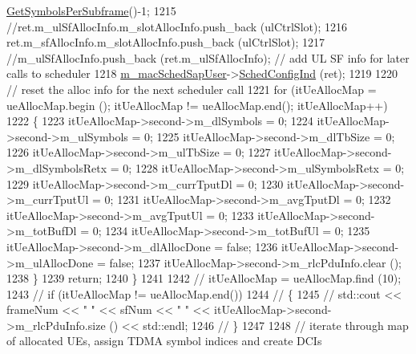 \begin{DoxyCode}
      \hyperlink{classns3_1_1MmWavePhyMacCommon_a2fe835b76e3c689defa413e395cd10cb}{GetSymbolsPerSubframe}()-1;
1215                 \textcolor{comment}{//ret.m\_ulSfAllocInfo.m\_slotAllocInfo.push\_back (ulCtrlSlot);}
1216                 ret.m\_sfAllocInfo.m\_slotAllocInfo.push\_back (ulCtrlSlot);
1217                 \textcolor{comment}{//m\_ulSfAllocInfo.push\_back (ret.m\_ulSfAllocInfo); // add UL SF info for later calls to
       scheduler}
1218                 \hyperlink{classns3_1_1MmWaveFlexTtiPfMacScheduler_a06177d3b0a466e035764a4101cfafc9e}{m\_macSchedSapUser}->\hyperlink{classns3_1_1MmWaveMacSchedSapUser_ac164dd52215c3924cf421b56089eece4}{SchedConfigInd} (ret);
1219 
1220                 \textcolor{comment}{// reset the alloc info for the next scheduler call}
1221                 \textcolor{keywordflow}{for} (itUeAllocMap = ueAllocMap.begin (); itUeAllocMap != ueAllocMap.end(); itUeAllocMap++)
1222                 \{
1223                         itUeAllocMap->second->m\_dlSymbols = 0;
1224                         itUeAllocMap->second->m\_ulSymbols = 0;
1225                         itUeAllocMap->second->m\_dlTbSize = 0;
1226                         itUeAllocMap->second->m\_ulTbSize = 0;
1227                         itUeAllocMap->second->m\_dlSymbolsRetx = 0;
1228                         itUeAllocMap->second->m\_ulSymbolsRetx = 0;
1229                         itUeAllocMap->second->m\_currTputDl = 0;
1230                         itUeAllocMap->second->m\_currTputUl = 0;
1231                         itUeAllocMap->second->m\_avgTputDl = 0;
1232                         itUeAllocMap->second->m\_avgTputUl = 0;
1233                         itUeAllocMap->second->m\_totBufDl = 0;
1234                         itUeAllocMap->second->m\_totBufUl = 0;
1235                         itUeAllocMap->second->m\_dlAllocDone = \textcolor{keyword}{false};
1236                         itUeAllocMap->second->m\_ulAllocDone = \textcolor{keyword}{false};
1237                         itUeAllocMap->second->m\_rlcPduInfo.clear ();
1238                 \}
1239                 \textcolor{keywordflow}{return};
1240         \}
1241 
1242 \textcolor{comment}{//      itUeAllocMap = ueAllocMap.find (10);}
1243 \textcolor{comment}{//      if (itUeAllocMap != ueAllocMap.end())}
1244 \textcolor{comment}{//      \{}
1245 \textcolor{comment}{//              std::cout << frameNum << " " << sfNum << " " << itUeAllocMap->second->m\_rlcPduInfo.size ()
       << std::endl;}
1246 \textcolor{comment}{//      \}}
1247 
1248         \textcolor{comment}{// iterate through map of allocated UEs, assign TDMA symbol indices and create DCIs}

\end{DoxyCode}
